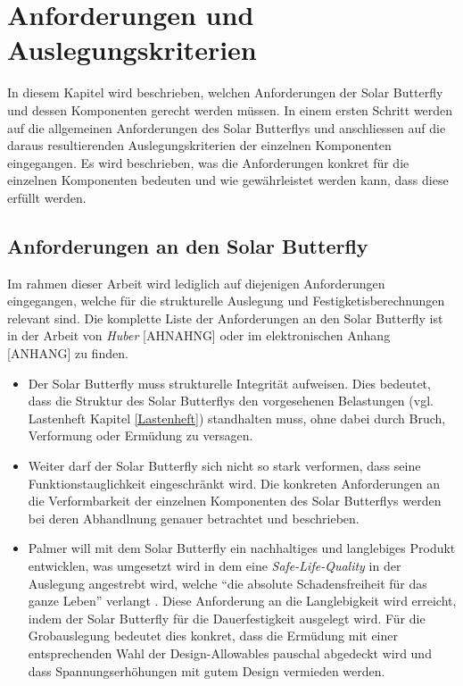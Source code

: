 \section{Anforderungen und Auslegungskriterien}
In diesem Kapitel wird beschrieben, welchen Anforderungen der Solar Butterfly und dessen Komponenten gerecht werden müssen. In einem ersten Schritt werden auf die allgemeinen Anforderungen des Solar Butterflys und anschliessen auf die daraus resultierenden Auslegungskriterien der einzelnen Komponenten eingegangen. Es wird beschrieben, was die Anforderungen konkret für die einzelnen Komponenten bedeuten und wie gewährleistet werden kann, dass diese erfüllt werden.\\


\subsection{Anforderungen an den Solar Butterfly}
Im rahmen dieser Arbeit wird lediglich auf diejenigen Anforderungen eingegangen, welche für die strukturelle Auslegung und Festigketisberechnungen relevant sind. Die komplette Liste der Anforderungen an den Solar Butterfly ist in der Arbeit von \emph{Huber} [AHNAHNG] oder im elektronischen Anhang [ANHANG] zu finden.
\begin{itemize}
  \item Der Solar Butterfly muss strukturelle Integrität aufweisen. Dies bedeutet, dass die Struktur des Solar Butterflys den vorgesehenen Belastungen (vgl. Lastenheft Kapitel \ref{Lastenheft}) standhalten muss, ohne dabei durch Bruch, Verformung oder Ermüdung zu versagen.
  \item Weiter darf der Solar Butterfly sich nicht so stark verformen, dass seine Funktionstauglichkeit eingeschränkt wird. Die konkreten Anforderungen an die Verformbarkeit der einzelnen Komponenten des Solar Butterflys werden bei deren Abhandlnung genauer betrachtet und beschrieben.
  \item Palmer will mit dem Solar Butterfly ein nachhaltiges und langlebiges Produkt entwicklen, was umgesetzt wird in dem eine \emph{Safe-Life-Quality} in der Auslegung angestrebt wird, welche ``die absolute Schadensfreiheit für das ganze Leben'' verlangt \cite{klein}. Diese Anforderung an die Langlebigkeit wird erreicht, indem der Solar Butterfly für die Dauerfestigkeit ausgelegt wird. Für die Grobauslegung bedeutet dies konkret, dass die Ermüdung mit einer entsprechenden Wahl der Design-Allowables pauschal abgedeckt wird und dass Spannungserhöhungen mit gutem Design vermieden werden.
\end{itemize}

